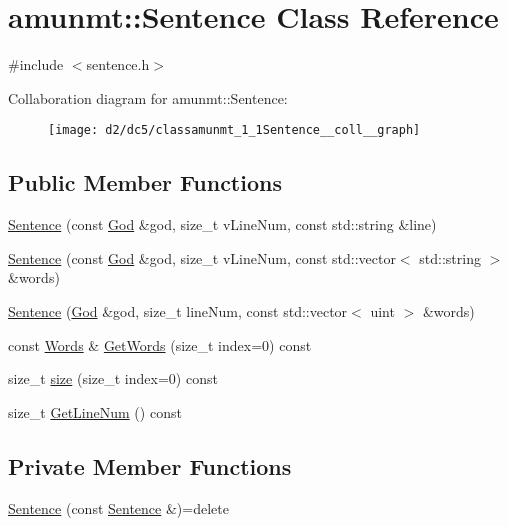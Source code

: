 \hypertarget{classamunmt_1_1Sentence}{}\section{amunmt\+:\+:Sentence Class Reference}
\label{classamunmt_1_1Sentence}


{\ttfamily \#include $<$sentence.\+h$>$}



Collaboration diagram for amunmt\+:\+:Sentence\+:
\nopagebreak
\begin{figure}[H]
\begin{center}
\leavevmode
\texttt{[image: d2/dc5/classamunmt\_1\_1Sentence\_\_coll\_\_graph]}
\end{center}
\end{figure}
\subsection*{Public Member Functions}
\begin{DoxyCompactItemize}
\item 
\hyperlink{classamunmt_1_1Sentence_aa0f7259a5e6f30f4b50e71dc44c83a2e}{Sentence} (const \hyperlink{classamunmt_1_1God}{God} \&god, size\+\_\+t v\+Line\+Num, const std\+::string \&line)
\item 
\hyperlink{classamunmt_1_1Sentence_a571bf14105075f95c2d58562fcc86018}{Sentence} (const \hyperlink{classamunmt_1_1God}{God} \&god, size\+\_\+t v\+Line\+Num, const std\+::vector$<$ std\+::string $>$ \&words)
\item 
\hyperlink{classamunmt_1_1Sentence_a855d515a6973ef61ed2f5a9c469dfb75}{Sentence} (\hyperlink{classamunmt_1_1God}{God} \&god, size\+\_\+t line\+Num, const std\+::vector$<$ uint $>$ \&words)
\item 
const \hyperlink{namespaceamunmt_aa50d0b3a5ba58ba5da8a4d88ddab1b18}{Words} \& \hyperlink{classamunmt_1_1Sentence_a929bbcefc70b6bc280bbdadb3be00ec9}{Get\+Words} (size\+\_\+t index=0) const 
\item 
size\+\_\+t \hyperlink{classamunmt_1_1Sentence_a9f6ee04c9dd03b9933d8fbee4eadc259}{size} (size\+\_\+t index=0) const 
\item 
size\+\_\+t \hyperlink{classamunmt_1_1Sentence_a4166fdc6aacb417cb7e21334f57a1e34}{Get\+Line\+Num} () const 
\end{DoxyCompactItemize}
\subsection*{Private Member Functions}
\begin{DoxyCompactItemize}
\item 
\hyperlink{classamunmt_1_1Sentence_a18cc0ecedde9d644f895f3ce70ac5afb}{Sentence} (const \hyperlink{classamunmt_1_1Sentence}{Sentence} \&)=delete
\end{DoxyCompactItemize}
